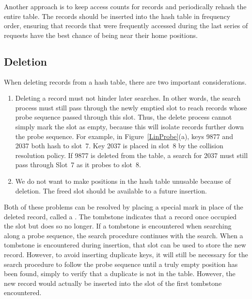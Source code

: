Another approach is to keep access counts for records and
periodically rehash the entire table.
The records should be inserted into the hash table in frequency
order, ensuring that records that were frequently accessed during the
last series of requests have the best chance of being near their home
positions.

\subsection{Deletion}
\label{HashDel}

When deleting records from a hash table, there are two important
considerations.

\begin{enumerate}

\item
Deleting a record must not hinder later searches.
In other words, the search process must still pass through
the newly emptied slot to reach records whose probe sequence
passed through this slot.
Thus, the delete process cannot simply mark the slot as empty,
because this will isolate records further down the
probe sequence.
For example, in Figure~\ref{LinProbe}(a), keys 9877 and 2037 both hash
to slot~7.
Key 2037 is placed in slot~8 by the collision resolution policy.
If 9877 is deleted from the table, a search for 2037 must still pass
through Slot~7 as it probes to slot~8.

\item
We do not want to make positions in the hash table unusable because
of deletion.
The freed slot should be available to a future insertion.

\end{enumerate}

Both of these problems can be resolved by placing a special mark in
place of the deleted record, called a
.
The tombstone indicates that a record once occupied the slot but
does so no longer.
If a tombstone is encountered when searching along a
probe sequence, the search procedure
continues with the search.
When a tombstone is encountered during insertion, that slot
can be used to store the new record.
However, to avoid inserting duplicate keys, it will still be necessary
for the search procedure to follow the probe sequence until a truly
empty position has been found, simply to verify that a duplicate is
not in the table.
However, the new record would actually be inserted into the slot of
the first tombstone encountered.

